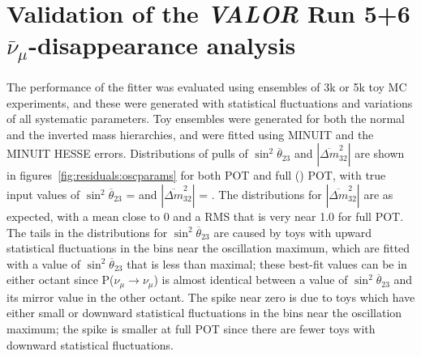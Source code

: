 \clearpage

\section {Validation of the {\em VALOR} Run 5+6  $\bar{\nu}_{\mu}$-disappearance analysis}
\label{sec:validation}

The performance of the fitter was evaluated using ensembles of 3k or 5k toy MC experiments, and these were
generated with statistical fluctuations and variations of all \NSyst{} systematic parameters.
Toy ensembles were generated for both the normal and the inverted mass hierarchies, and were fitted 
using MINUIT and the MINUIT HESSE errors. Distributions of pulls of $\sin^{2}\overline{\theta}_{23}$ 
and $|\overline{\Delta m}^2_{32}|$ are shown in figures~\ref{fig:residuals:oscparams} for both \FakePot{} 
POT and full (\TargetFullPot{}) POT, with true input values of  
$\sin^{2}\overline{\theta}_{23}$ = \MixingTwoThreeNH{} and $|\overline{\Delta m}^2_{32}|$ = \DmsqNH{}. 
The distributions for $|\overline{\Delta m}^2_{32}|$ are as expected, with a mean close to 0 and a RMS 
that is very near 1.0 for full POT. The tails in the distributions for $\sin^{2}\overline{\theta}_{23}$ are 
caused by toys with upward statistical fluctuations in the bins near the oscillation maximum, which 
are fitted with a value of $\sin^{2}\overline{\theta}_{23}$ that is less than maximal; these best-fit 
values can be in either octant since P($\nu_{\mu} \rightarrow \nu_{\mu}$) is almost identical between a 
value of $\sin^{2}\overline{\theta}_{23}$ and its mirror value in the other octant. The spike near zero 
is due to toys which have either small or downward statistical fluctuations in the bins near the 
oscillation maximum; the spike is smaller at full POT since there are fewer toys with downward statistical 
fluctuations.   

